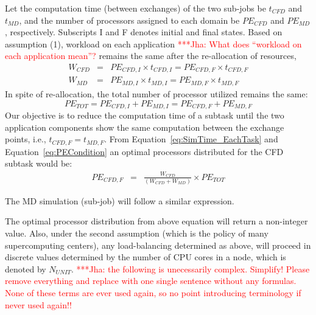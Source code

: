 \documentclass[conference,final]{IEEEtran}
\newcommand{\jhanote}[1]{ {\textcolor{red} { ***Jha: #1 }}}
\newcommand{\jhanote}[1]{}
\begin{document}
Let the computation time (between exchanges) of the two sub-jobs be
$t_{CFD}$ and $t_{MD}$, and the number of processors assigned to each
domain be $PE_{CFD}$ and $PE_{MD}$, respectively. Subscripts I and F
denotes initial and final states. Based on assumption (1), workload on
each application\jhanote{What does ``workload on each application
  mean''?} remains the same after the re-allocation of resources,
\begin{eqnarray}
W_{CFD} &=& PE_{CFD,I} \times t_{CFD,I} = PE_{CFD,F} \times t_{CFD,F} \nonumber \\
W_{MD} &=& PE_{MD,I} \times t_{MD,I} = PE_{MD,F} \times t_{MD,F}
\label{eq:SimTime_EachTask}
\end{eqnarray}
In spite
of re-allocation, the total number of processor utilized remains the
same:
\begin{equation}
PE_{TOT} = PE_{CFD,I} + PE_{MD,I} = PE_{CFD,F} + PE_{MD,F}
\label{eq:PECondition}
\end{equation}
Our objective is to reduce the computation time of a subtask until the
two application components show the same computation between the exchange points,
i.e., $t_{CFD,F} = t_{MD,F}$. From Equation~\ref{eq:SimTime_EachTask}
and Equation~\ref{eq:PECondition} an optimal processors distributed
for the CFD subtask would be:
\begin{eqnarray}
PE_{CFD,F} & = & \frac {W_{CFD}} {(W_{CFD} + W_{MD})} \times PE_{TOT}
\end{eqnarray}

The MD simulation (sub-job) will follow a similar expression. 

The optimal processor distribution from above equation will return a
non-integer value. Also, under the second assumption (which is the
policy of many supercomputing centers), any load-balancing determined
as above, will proceed in discrete values determined by the number of
CPU cores in a node, which is denoted by $N_{UNIT}$.  \jhanote{the
  following is unecessarily complex. Simplify! Please remove
  everything and replace with one single sentence without any
  formulas. None of these terms are ever used again, so no point
  introducing terminology if never used again!!}
\end{document}
